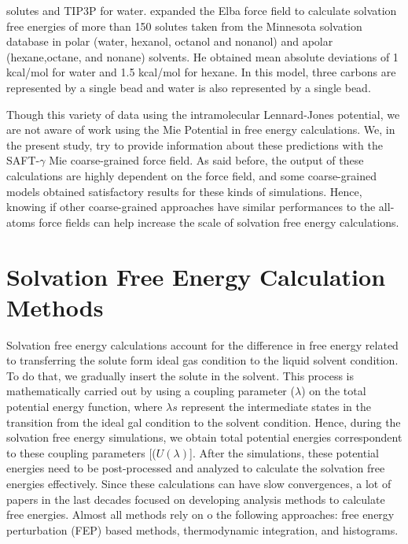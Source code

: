 solutes and TIP3P for water.  expanded the Elba force field to calculate solvation free energies of more than 150 solutes taken from the Minnesota solvation
database in polar (water, hexanol, octanol and nonanol) and apolar (hexane,octane, and nonane) solvents. He obtained mean absolute deviations of 1 kcal/mol for water and 1.5 kcal/mol for hexane. In this model, three carbons are represented by a single bead and water is also represented by a single bead. 

Though this variety of data using the intramolecular Lennard-Jones potential, we are not aware of work using the Mie Potential in free energy calculations. We, in the present study, try to provide information about these predictions with the SAFT-$\gamma$ Mie coarse-grained force field.  As said before, the output of these calculations are highly dependent on the force field, and some coarse-grained models obtained satisfactory results for these kinds of simulations. Hence, knowing if other coarse-grained approaches have similar performances to the all-atoms force fields can help increase the scale of solvation free energy calculations. 

\section{Solvation Free Energy Calculation Methods}\label{SFECM}

Solvation free energy calculations account for the difference in free energy related to transferring the solute form ideal gas condition to the liquid solvent condition. To do that, we gradually insert the solute in the solvent. This process is mathematically carried out by using a coupling parameter ($\lambda$) on the total potential energy function, where $\lambda s$ represent the intermediate states in the transition from the ideal gal condition to the solvent condition. Hence,  during the solvation free energy simulations, we obtain total potential energies correspondent to these coupling parameters [($U(\lambda)$]. After the simulations, these potential energies need to be post-processed and analyzed to calculate the solvation free energies effectively. Since these calculations can have slow convergences, a lot of papers in the last decades focused on developing analysis methods to calculate free energies. Almost all methods rely on o the following approaches:  free energy perturbation (FEP) based methods, thermodynamic integration, and histograms.

